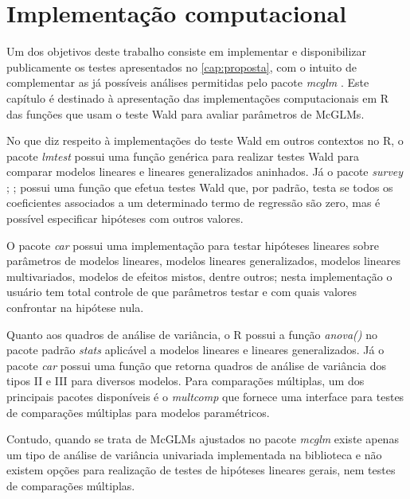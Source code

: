 
\chapter{Implementação computacional}\label{cap:implementacao}


Um dos objetivos deste trabalho consiste em implementar e disponibilizar publicamente os testes apresentados no \autoref{cap:proposta}, com o intuito de complementar as já possíveis análises permitidas pelo pacote \emph{mcglm} \citep{mcglm}. Este capítulo é destinado à apresentação das implementações computacionais em R das funções que usam o teste Wald para avaliar parâmetros de McGLMs.

No que diz respeito à implementações do teste Wald em outros contextos no R, o pacote \emph{lmtest} \citep{lmtest} possui uma função genérica para realizar testes Wald para comparar modelos lineares e lineares generalizados aninhados. Já o pacote \emph{survey} \citep{survey1}; \citep{survey2};\citep{survey3} possui uma função que efetua testes Wald que, por padrão, testa se todos os coeficientes associados a um determinado termo de regressão são zero, mas é possível especificar hipóteses com outros valores. 

O pacote \emph{car} \citep{car} possui uma implementação para testar hipóteses lineares sobre parâmetros de modelos lineares, modelos lineares generalizados, modelos lineares multivariados, modelos de efeitos mistos, dentre outros; nesta implementação o usuário tem total controle de que parâmetros testar e com quais valores confrontar na hipótese nula. 

Quanto aos quadros de análise de variância, o R possui a função \emph{anova()} no pacote padrão \emph{stats} \citep{softwareR} aplicável a modelos lineares e lineares generalizados. Já o pacote \emph{car} \citep{car} possui uma função que retorna quadros de análise de variância dos tipos II e III para diversos modelos. Para comparações múltiplas, um dos principais pacotes disponíveis é o \emph{multcomp} \citep{multcomp} que fornece uma interface para testes de comparações múltiplas para modelos paramétricos.

Contudo, quando se trata de McGLMs ajustados no pacote \emph{mcglm} existe apenas um tipo de análise de variância univariada implementada na biblioteca e não existem opções para realização de testes de hipóteses lineares gerais, nem testes de comparações múltiplas.

